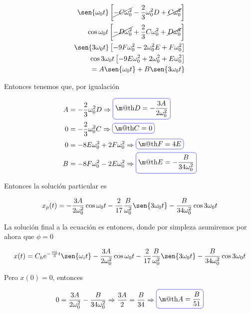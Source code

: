 \documentclass[a4paper,10pt]{article}
\makeatletter
\numberwithin{equation}{section}
\newcommand*{\boxcolor}{blue}
\renewcommand{\boxed}[1]{\textcolor{\boxcolor}{%
\tikz[baseline={([yshift=-1ex]current bounding box.center)}] \node [rectangle, minimum width=1ex,rounded corners,draw] {\normalcolor\m@th$\displaystyle#1$};}}
\newcommand{\euler}{\mathrm{e}}
\makeatother
\begin{document}
\begin{align}
 \begin{split}
  \sen{\omega_0t}\left[\cancel{- C\omega_0^2} - \frac{2}{3} \omega_0^2 D  + \cancel{C\omega_0^2}  \right] \\
  \cos{\omega_0t}\left[\cancel{- D\omega_0^2} + \frac{2}{3} C \omega_0^2 + \cancel{D\omega_0^2} \right] \\
  \sen{3\omega_0t} \left[ - 9F\omega_0^2 - 2 \omega_0^2 E + F\omega_0^2 \right] \\
  \cos{3\omega_0t} \left[  - 9E\omega_0^2 + 2 \omega_0^2 + E\omega_0^2 \right] \\
  = A \sen{\omega_0t} + B \sen{3\omega_0t} 
  \end{split}
\end{align}

Entonces tenemos que, por igualación

\begin{align*}
 A &= - \frac{2}{3} \omega_0^2 D \Rightarrow \boxed{D = - \frac{3A}{2\omega_0^2}} \\
 0 &= - \frac{2}{3} \omega_0^2 C \Rightarrow \boxed{C = 0} \\
 0 &= -8E\omega_0^2 + 2F\omega_0^2 \Rightarrow \boxed{F = 4E} \\
 B &= -8F \omega_0^2 - 2E \omega_0^2 \Rightarrow \boxed{E = - \frac{B}{34\omega_0^2}}
\end{align*}

Entonces la solución particular es

\begin{equation}
 x_p(t) = - \frac{3A}{2\omega_0^2} \cos{\omega_0t} - \frac{2}{17} 
 \frac{B}{\omega_0^2} \sen{3\omega_0t} - \frac{B}{34\omega_0^2} \cos{3\omega_0t}
\end{equation}

La solución final a la ecuación es entonces, donde por simpleza asumiremos por ahora que $\phi = 0$

\begin{equation}
 x(t) = C_h \euler^{-\frac{\omega_0}{3} t} \sen{\omega_i t} - \frac{3A}{2\omega_0^2} \cos{\omega_0t} - \frac{2}{17} 
 \frac{B}{\omega_0^2} \sen{3\omega_0t} - \frac{B}{34\omega_0^2} \cos{3\omega_0t}
\end{equation}

Pero $x(0) = 0$, entonces

\begin{equation}
 0 = \frac{3A}{2\omega_0^2} - \frac{B}{34\omega_0^2} \Rightarrow \frac{3A}{2} = \frac{B}{34} \Rightarrow \boxed{A = \frac{B}{51}}
\end{equation}
\end{document}
